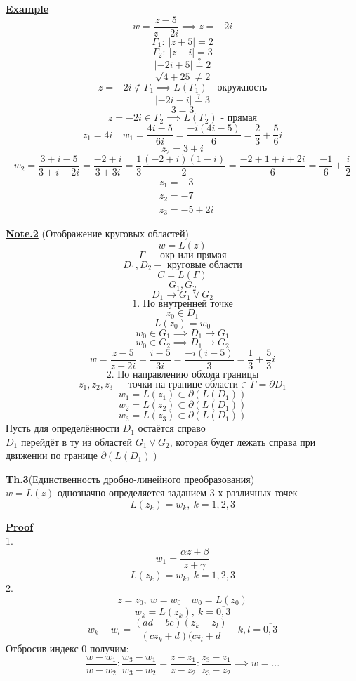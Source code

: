 \documentclass[a4paper]{article}
\begin{document}
\textbf{\underline{Example}} 
\[
     w = \frac{z - 5}{z + 2i} \implies z = -2i 
\]
\[
    \Gamma_1: \ |z + 5| = 2
\]
\[
    \Gamma_2: \ |z - i| = 3
\]
\[
    |-2i + 5| \stackrel{?}{=} 2
\]
\[
    \sqrt{4 + 25} \neq 2
\]
\[
    z = -2i \notin \Gamma_1 \implies L(\Gamma_1) \text{ - окружность}
\]
\[
    |-2i - i| \stackrel{?}{=} 3
\]
\[
    3 = 3
\]
\[
    z = -2i \in \Gamma_2 \implies L(\Gamma_2) \text{ - прямая}
\]
\[
    z_1 = 4i \quad w_1 = \frac{4i -5}{6i} = \frac{-i(4i - 5)}{6} =
    \frac{2}{3} + \frac{5}{6} i
\]
\[
    z_2 = 3 + i
\]
\[
    w_2 = \frac{3 + i - 5}{3 + i + 2i} = \frac{-2 + i}{3 + 3i} 
    = \frac{1}{3} \frac{(-2+i)(1-i)}{2} = \frac{-2+1+i+2i}{6} =
    \frac{-1}{6} + \frac{i}{2} 
\]
\[
\begin{aligned}
    &z_1 = -3\\
    &z_2 = -7\\
    &z_3 = -5 + 2i
\end{aligned}
\]

\textbf{\underline{Note.2}} (Отображение круговых областей)
\[
    w = L(z)
\]
\[
    \Gamma - \text{ окр или прямая}
\]
\[
    D_1, D_2 - \text{ круговые области}
\]
\[
    C = L(\Gamma)
\]
\[
    G_1, G_2
\]
\[
    D_1 \to G_1 \lor G_2
\]
\[
    1. \text{ По внутренней точке}
\]
\[
    z_0 \in D_1
\]
\[
    L(z_0) = w_0
\]
\[
    w_0 \in G_1 \implies D_1 \to G_1
\]
\[
    w_0 \in G_2 \implies D_1 \to G_2
\]
\[
    w = \frac{z-5}{z+2i} = \frac{i -5}{3i} = \frac{-i(i-5)}{3} = \frac{1}{3} +
    \frac{5}{3} i
\]
\[
    2. \text{ По направлению обхода границы}
\]
\[
    z_1, z_2, z_3 - \text{ точки на границе области} \in \Gamma = \partial D_1
\]
\[
    w_1 = L(z_1) \subset \partial(L(D_1))
\]
\[
    w_2 = L(z_2) \subset \partial(L(D_1))
\]
\[
    w_3 = L(z_3) \subset \partial(L(D_1))
\]
Пусть для определённости $ D_1 $ остаётся справо\\
$ D_1 $ перейдёт в ту из областей $ G_1 \lor G_2 $, которая будет лежать справа
при движении по границе $ \partial(L(D_1)) $ 

\begin{tcolorbox}
\textbf{\underline{Th.3}}(Единственность дробно-линейного преобразования)\\
$ w = L(z) $ однозначно определяется заданием 3-х различных точек
\[
    L(z_k) = w_k, \ k = 1,2,3
\]

\textbf{\underline{Proof}}\\
1.
\[
    w_1 = \frac{\alpha z + \beta}{z + \gamma} 
\]
\[
    L(z_k) = w_k, \ k= 1,2,3
\]
2.
\[
    z = z_0, \ w = w_0 \quad w_0 = L(z_0)
\]
\[
    w_k = L(z_k), \ k= \overline{0,3}
\]
\[
    w_k - w_l = \frac{(ad - bc)(z_k - z_l)}{(cz_k + d)(cz_l +d}  \quad k,l = \overline{0,3}
\]
Отбросив индекс 0 получим:
\begin{equation}
    \frac{w - w_1}{w - w_2} : \frac{w_3 - w_1}{w_3-w_2} = 
    \frac{z - z_1}{z - z_2} : \frac{z_3 - z_1}{z_3-z_2} \implies w = \dots
    \label{eq:1}
\end{equation}
\end{tcolorbox}
\end{document}
